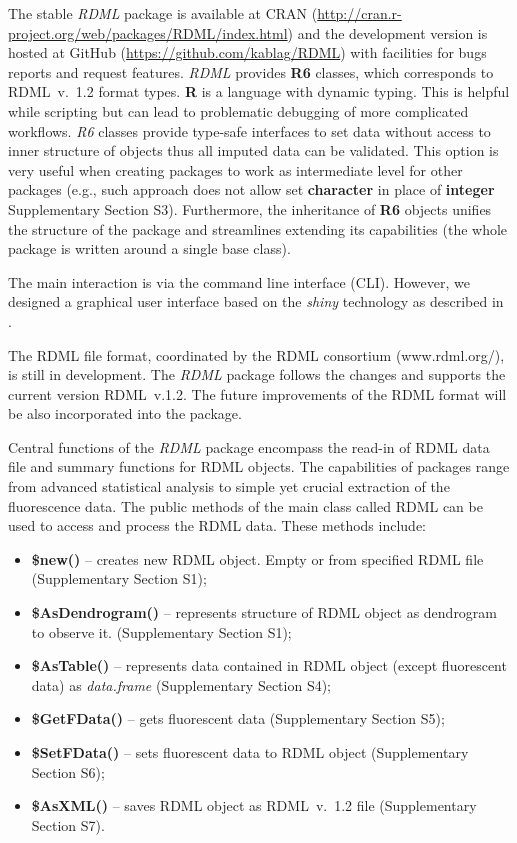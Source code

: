 \documentclass{bioinfo}
\begin{document}
	The stable \textit{RDML} package is available at CRAN
	(\url{http://cran.r-project.org/web/packages/RDML/index.html}) and the
	development version is hosted at GitHub (\url{https://github.com/kablag/RDML})
	with facilities for bugs reports and request features. \textit{RDML}
	provides \textbf{R6} classes, which corresponds to RDML~v.~1.2 format types.
	\textbf{R} is a language with dynamic typing. This is helpful while scripting but
	can lead to problematic debugging of more complicated workflows. \emph{R6} classes
	provide type-safe interfaces to set data without access to inner structure of
	objects thus all imputed data can be validated. This option is very useful when
	creating packages to work as intermediate level for other packages (e.g., such
	approach does not allow set \textbf{character} in place of \textbf{integer}
	Supplementary Section S3). Furthermore, the inheritance of \textbf{R6} objects 
	unifies the structure of the package and streamlines extending its capabilities 
	(the whole package is written around a single base class).
	
	The main interaction is via the command line interface (CLI). However, 
	we designed a graphical user interface based on the \textit{shiny} technology as described in \cite{roediger2015chippcr}.
	
	The RDML file format, coordinated by the RDML consortium (www.rdml.org/), is still 
	in development. The \textit{RDML} package follows the changes and supports the 
	current version RDML~v.1.2. The future improvements of the RDML format will be also 
	incorporated into the package.
	
	Central functions of the \textit{RDML} package encompass the read-in of RDML
	data file and summary functions for RDML objects. The capabilities of packages range 
	from advanced statistical analysis to simple yet crucial extraction of the fluorescence 
	data. The public methods of the main class called RDML can be used to access and process 
	the RDML data. These methods include: \begin{itemize} \item
		\textbf{\$new()} -- creates new RDML object. Empty or from specified RDML file
		(Supplementary Section S1); \item \textbf{\$AsDendrogram()} -- represents
		structure of RDML object as dendrogram to observe it. (Supplementary Section
		S1); \item \textbf{\$AsTable()} -- represents data contained in RDML object
		(except fluorescent data) as \textit{data.frame} (Supplementary Section S4);
		\item \textbf{\$GetFData()} -- gets fluorescent data (Supplementary Section S5);
		\item \textbf{\$SetFData()} -- sets fluorescent data to RDML object
		(Supplementary Section S6); \item \textbf{\$AsXML()} -- saves RDML object as
		RDML~v.~1.2 file (Supplementary Section S7). \end{itemize}
	
\end{document}

